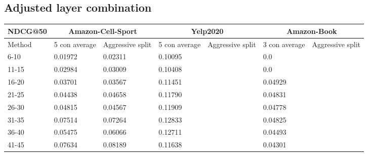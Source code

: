 \subsection{Adjusted layer combination}\label{app:adjusted-layer-combi}

\begin{table*}[h!]
    \centering
    \begin{tabular}{|l|l|l||l|l||l|l|}
        \hline
        NDCG@50   & \multicolumn{2}{c||}{Amazon-Cell-Sport} & \multicolumn{2}{c||}{Yelp2020} & \multicolumn{2}{c|}{Amazon-Book}                                                       \\ \hline
        Method    & 5 con average                           & Aggressive split               & 5 con average                    & Aggressive split & 3 con average & Aggressive split \\ \hline
        6-10      & 0.01972                                 & 0.02311                        & 0.10095                          &                  & 0.0           &                  \\ \hline
        11-15     & 0.02984                                 & 0.03009                        & 0.10408                          &                  & 0.0           &                  \\ \hline
        16-20     & 0.03701                                 & 0.03567                        & 0.11451                          &                  & 0.04929       &                  \\ \hline
        21-25     & 0.04438                                 & 0.04658                        & 0.11790                          &                  & 0.04831       &                  \\ \hline
        26-30     & 0.04815                                 & 0.04567                        & 0.11909                          &                  & 0.04778       &                  \\ \hline
        31-35     & 0.07514                                 & 0.07264                        & 0.12833                          &                  & 0.04825       &                  \\ \hline
        36-40     & 0.05475                                 & 0.06066                        & 0.12711                          &                  & 0.04493       &                  \\ \hline
        41-45     & 0.07634                                 & 0.08189                        & 0.11638                          &                  & 0.04301       &                  \\ \hline

\end{tabular}
\end{table*}

